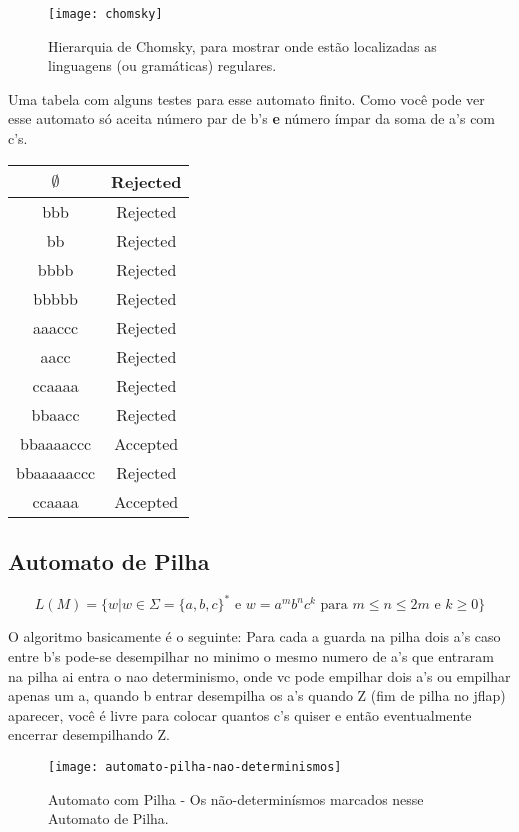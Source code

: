 \documentclass[12pt, a4paper]{article}
\begin{document}
\begin{figure}[ht]
  \centering
  \texttt{[image: chomsky]}
  \caption{Hierarquia de Chomsky, para mostrar onde estão localizadas as linguagens (ou gramáticas) regulares.}
\end{figure}


\qquad Uma tabela com alguns testes para esse automato finito. Como você pode ver esse automato só aceita número par de b's \textbf{e} número ímpar da soma de a's com c's.

\begin{tabular}{|c|c|}
  \hline $\emptyset$ & Rejected \\
  \hline bbb         & Rejected \\
  \hline bb          & Rejected \\
  \hline bbbb        & Rejected \\
  \hline bbbbb       & Rejected \\
  \hline aaaccc      & Rejected \\
  \hline aacc        & Rejected \\
  \hline ccaaaa      & Rejected \\
  \hline bbaacc      & Rejected \\
  \hline bbaaaaccc   & Accepted \\
  \hline bbaaaaaccc  & Rejected \\
  \hline ccaaaa      & Accepted \\
  \hline
\end{tabular}

\pagebreak
\subsection{Automato de Pilha}

$$ L(M)= \lbrace w \vert w \in \Sigma =  {\lbrace a,b,c \rbrace}^* \text{ e } w = {{a}^m}{{b}^n}{{c}^k} \text{ para } m \leqslant n  \leqslant 2m \text{ e } k \geqslant 0 \rbrace $$

\qquad O algoritmo basicamente é o seguinte: Para cada a guarda na pilha dois a's caso entre b's pode-se desempilhar no minimo o mesmo numero de a's que entraram na pilha ai entra o nao determinismo, onde vc pode empilhar dois a's ou empilhar apenas um a, quando b entrar desempilha os a's quando Z (fim de pilha no jflap) aparecer, você é livre para colocar quantos c's quiser e então eventualmente encerrar desempilhando Z.

\begin{figure}[ht]
  \centering
  \texttt{[image: automato-pilha-nao-determinismos]}
  \caption{Automato com Pilha - Os não-determinísmos marcados nesse Automato de Pilha.}
\end{figure}
\end{document}
